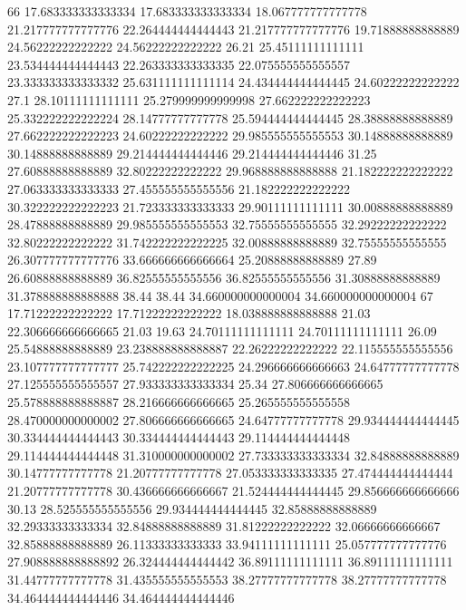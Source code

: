 66 17.683333333333334 17.683333333333334 18.067777777777778 21.217777777777776 22.264444444444443 21.217777777777776 19.71888888888889 24.56222222222222 24.56222222222222 26.21 25.45111111111111 23.534444444444443 22.263333333333335 22.075555555555557 23.333333333333332 25.631111111111114 24.434444444444445 24.60222222222222 27.1 28.10111111111111 25.279999999999998 27.662222222222223 25.332222222222224 28.14777777777778 25.594444444444445 28.38888888888889 27.662222222222223 24.60222222222222 29.985555555555553 30.14888888888889 30.14888888888889 29.214444444444446 29.214444444444446 31.25 27.60888888888889 32.80222222222222 29.968888888888888 21.182222222222222 27.063333333333333 27.455555555555556 21.182222222222222 30.322222222222223 21.723333333333333 29.90111111111111 30.00888888888889 28.47888888888889 29.985555555555553 32.75555555555555 32.29222222222222 32.80222222222222 31.742222222222225 32.00888888888889 32.75555555555555 26.307777777777776 33.666666666666664 25.20888888888889 27.89 26.60888888888889 36.82555555555556 36.82555555555556 31.30888888888889 31.378888888888888 38.44 38.44 34.660000000000004 34.660000000000004
67 17.71222222222222 17.71222222222222 18.038888888888888 21.03 22.306666666666665 21.03 19.63 24.70111111111111 24.70111111111111 26.09 25.54888888888889 23.238888888888887 22.26222222222222 22.115555555555556 23.107777777777777 25.742222222222225 24.296666666666663 24.64777777777778 27.125555555555557 27.933333333333334 25.34 27.806666666666665 25.578888888888887 28.216666666666665 25.265555555555558 28.470000000000002 27.806666666666665 24.64777777777778 29.934444444444445 30.334444444444443 30.334444444444443 29.114444444444448 29.114444444444448 31.310000000000002 27.733333333333334 32.84888888888889 30.14777777777778 21.20777777777778 27.053333333333335 27.474444444444444 21.20777777777778 30.436666666666667 21.524444444444445 29.856666666666666 30.13 28.525555555555556 29.934444444444445 32.85888888888889 32.29333333333334 32.84888888888889 31.81222222222222 32.06666666666667 32.85888888888889 26.11333333333333 33.94111111111111 25.057777777777776 27.908888888888892 26.324444444444442 36.89111111111111 36.89111111111111 31.44777777777778 31.435555555555553 38.27777777777778 38.27777777777778 34.464444444444446 34.464444444444446

